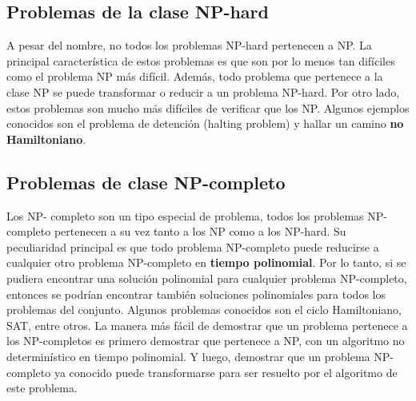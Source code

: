 \documentclass[spanish,12pt]{elsarticle}
\begin{document}
\subsection{Problemas de la clase NP-hard}
A pesar del nombre, no todos los problemas NP-hard pertenecen a NP. La principal característica de estos problemas es que son por lo menos tan difíciles como el problema NP más difícil. Además, todo problema que pertenece a la clase NP se puede transformar o reducir a un problema NP-hard. Por otro lado, estos problemas son mucho más difíciles de verificar que los NP. Algunos ejemplos conocidos son el problema de detención (halting problem) y hallar un camino \textbf{no Hamiltoniano}.


\subsection{Problemas de clase NP-completo}
Los NP- completo son un tipo especial de problema, todos los problemas NP-completo pertenecen a su vez tanto a los NP como a los NP-hard. Su peculiaridad principal es que todo problema NP-completo puede reducirse a cualquier otro problema NP-completo en \textbf{tiempo polinomial}. Por lo tanto, si se pudiera encontrar una solución polinomial para cualquier problema NP-completo, entonces se podrían encontrar también soluciones polinomiales para todos los problemas del conjunto. Algunos problemas conocidos son el ciclo Hamiltoniano, SAT, entre otros. La manera más fácil de demostrar que un problema pertenece a los NP-completos es primero demostrar que pertenece a NP, con un algoritmo no determinístico en tiempo polinomial. Y luego, demostrar que un problema NP-completo ya conocido puede transformarse para ser resuelto por el algoritmo de este problema.
\clearpage
\end{document}
